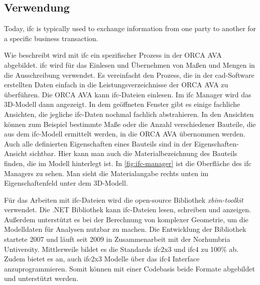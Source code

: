 \subsection{Verwendung}
\label{c:basics:ifc:usage}
\begin{displayquote}
	\glqq Today, \ac{ifc} is typically used to exchange information from one party to another for a specific business transaction.\grqq{} \citep{BuildingSMART_IFC}
\end{displayquote}
Wie \citeauthor{BuildingSMART_IFC} beschreibt wird mit \ac{ifc} ein spezifischer Prozess in der ORCA AVA abgebildet. \ac{ifc} wird für das Einlesen und Übernehmen von Maßen und Mengen in die Ausschreibung verwendet. Es vereinfacht den Prozess, die in der \ac{cad}-Software erstellten Daten einfach in die Leistungsverzeichnisse der ORCA AVA zu überführen.
Die ORCA AVA kann \ac{ifc}-Dateien einlesen. Im \ac{ifc} Manager wird das 3D-Modell dann angezeigt. In dem geöffneten Fenster gibt es einige fachliche Ansichten, die jegliche \ac{ifc}-Daten nochmal fachlich abstrahieren. In den Ansichten können zum Beispiel bestimmte Maße oder die Anzahl verschiedener Bauteile, die aus dem \ac{ifc}-Modell ermittelt werden, in die ORCA AVA übernommen werden. Auch alle definierten Eigenschaften eines Bauteils sind in der Eigenschaften-Ansicht sichtbar. Hier kann man auch die Materialbezeichnung des Bauteils finden, die im Modell hinterlegt ist. In \autoref{fig:ifc-manager} ist die Oberfläche des \ac{ifc} Managers zu sehen. Man sieht die Materialangabe rechts unten im Eigenschaftenfeld unter dem 3D-Modell.

Für das Arbeiten mit \ac{ifc}-Dateien wird die open-source Bibliothek \textit{xbim-toolkit} \citep{LockleyXbimEssentialslibrary2017} verwendet. Die .NET Bibliothek kann \ac{ifc}-Dateien lesen, schreiben und anzeigen. Außerdem unterstützt es bei der Berechnung von komplexer Geometrie, um die Modelldaten für Analysen nutzbar zu machen. Die Entwicklung der Bibliothek startete 2007 und läuft seit 2009 in Zusammenarbeit mit der Norhumbria Untiversity. Mittlerweile bildet es die Standards \ac{ifc2x3} und \ac{ifc4} zu 100\% ab. Zudem bietet es an, auch \ac{ifc2x3} Modelle über das \ac{ifc4} Interface anzuprogrammieren. Somit können mit einer Codebasis beide Formate abgebildet und unterstützt werden. \citep[vgl.][]{Xbim_ltd_history}


